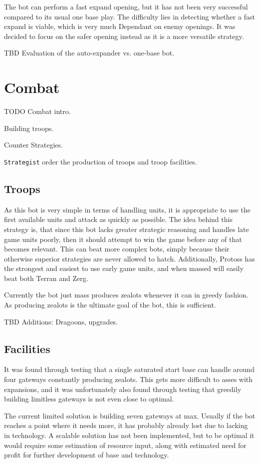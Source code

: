 		The bot can perform a fast expand opening, but it has not been very successful compared to its usual one base play. The difficulty lies in detecting whether a fast expand is viable, which is very much Dependant on enemy openings. It was decided to focus on the safer opening instead as it is a more versatile strategy.
		
		TBD Evaluation of the auto-expander vs. one-base bot.
		
\section{Combat}
TODO Combat intro.

Building troops.

Counter Strategies.

\texttt{Strategist} order the production of troops and troop facilities.

	\subsection*{Troops}
	As this bot is very simple in terms of handling units, it is appropriate to use the first available units and attack as quickly as possible. The idea behind this strategy is, that since this bot lacks greater strategic reasoning and handles late game units poorly, then it should attempt to win the game before any of that becomes relevant. This can beat more complex bots, simply because their otherwise superior strategies are never allowed to hatch. Additionally, Protoss has the strongest and easiest to use early game units, and when massed will easily beat both Terran and Zerg.

	Currently the bot just mass produces zealots whenever it can in greedy fashion. As producing zealots is the ultimate goal of the bot, this is sufficient.

	TBD Additions: Dragoons, upgrades.
	
	\subsection*{Facilities}
	It was found through testing that a single saturated start base can handle around four gateways constantly producing zealots. This gets more difficult to asses with expansions, and it was unfortunately also found through testing that greedily building limitless gateways is not even close to optimal.
	
	The current limited solution is building seven gateways at max. Usually if the bot reaches a point where it needs more, it has probably already lost due to lacking in technology. A scalable solution has not been implemented, but to be optimal it would require some estimation of resource input, along with estimated need for profit for further development of base and technology.

